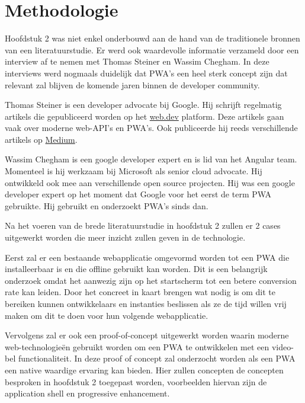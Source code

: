 
\chapter{Methodologie}
\label{ch:methodologie}


Hoofdstuk 2 was niet enkel onderbouwd aan de hand van de traditionele bronnen van een literatuurstudie. 
Er werd ook waardevolle informatie verzameld door een interview af te nemen met Thomas Steiner en Wassim Chegham. In deze interviews werd nogmaals duidelijk dat PWA's een heel sterk concept zijn dat relevant zal blijven de komende jaren binnen de developer community.


Thomas Steiner is een developer advocate bij Google. Hij schrijft regelmatig artikels die gepubliceerd worden op het \href{https://web.dev/authors/thomassteiner/}{web.dev} platform. Deze artikels gaan vaak over moderne web-API's en PWA's. Ook publiceerde hij reeds verschillende artikels op \href{https://medium.com/@tomayac}{Medium}.

Wassim Chegham is een google developer expert en is lid van het Angular team. Momenteel is hij werkzaam bij Microsoft als senior cloud advocate. Hij ontwikkeld ook mee aan verschillende open source projecten. Hij was een google developer expert op het moment dat Google voor het eerst de term PWA gebruikte. Hij gebruikt en onderzoekt PWA's sinds dan.

Na het voeren van de brede literatuurstudie in hoofdstuk 2 zullen er 2 cases uitgewerkt worden die meer inzicht zullen geven in de technologie.

Eerst zal er een bestaande webapplicatie omgevormd worden tot een PWA die installeerbaar is en die offline gebruikt kan worden. Dit is een belangrijk onderzoek omdat het aanwezig zijn op het startscherm tot een betere conversion rate kan leiden. Door het concreet in kaart brengen wat nodig is om dit te bereiken kunnen ontwikkelaars en instanties beslissen als ze de tijd willen vrij maken om dit te doen voor hun volgende webapplicatie.

Vervolgens zal er ook een proof-of-concept uitgewerkt worden waarin moderne web-technologieën gebruikt worden om een PWA te ontwikkelen met een video-bel functionaliteit. In deze proof of concept zal onderzocht worden als een PWA een native waardige ervaring kan bieden. Hier zullen concepten de concepten besproken in hoofdstuk 2 toegepast worden, voorbeelden hiervan zijn de application shell en  progressive enhancement.


